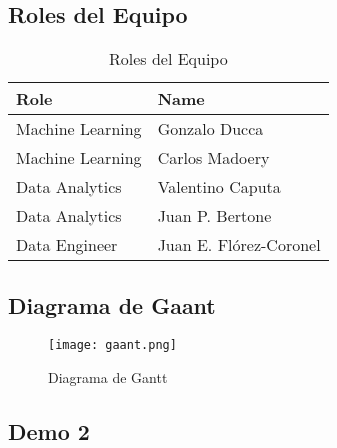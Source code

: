 \documentclass{other/docTemplate}
\begin{document}
\subsection{Roles del Equipo}
\begin{table}[H]
  \centering	
  \caption{Roles del Equipo}
  \begin{tabular}{|p{5cm}|p{10cm}|}
    \hline
    \textbf{Role} & \textbf{Name} \\\hline
    Machine Learning & Gonzalo Ducca \\\hline
    Machine Learning & Carlos Madoery \\\hline
    Data Analytics & Valentino Caputa \\\hline
    Data Analytics & Juan P. Bertone \\\hline
    Data Engineer & Juan E. Flórez-Coronel \\\hline
  \end{tabular}
  \label{tab:teamroles}
\end{table}
\subsection{Diagrama de Gaant}
\begin{figure}[htbp!]
  \texttt{[image: gaant.png]}
  \caption{Diagrama de Gantt}
  \label{fig:gaant}
\end{figure}

\subsection{Demo 2}
\end{document}
